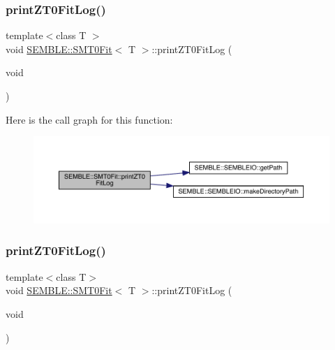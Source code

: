 \subsubsection{\texorpdfstring{printZT0FitLog()}{printZT0FitLog()}\hspace{0.1cm}{\footnotesize\ttfamily [1/2]}}
{\footnotesize\ttfamily template$<$class T $>$ \\
void \mbox{\hyperlink{structSEMBLE_1_1SMT0Fit}{S\+E\+M\+B\+L\+E\+::\+S\+M\+T0\+Fit}}$<$ T $>$\+::print\+Z\+T0\+Fit\+Log (\begin{DoxyParamCaption}\item[{void}]{ }\end{DoxyParamCaption})}

Here is the call graph for this function\+:
\nopagebreak
\begin{figure}[H]
\begin{center}
\leavevmode
\includegraphics[width=350pt]{d6/dad/structSEMBLE_1_1SMT0Fit_af8e7b3bd0f80d0f4eda9c02d0aa89912_cgraph}
\end{center}
\end{figure}
\mbox{\label{structSEMBLE_1_1SMT0Fit_af8e7b3bd0f80d0f4eda9c02d0aa89912}} 
\subsubsection{\texorpdfstring{printZT0FitLog()}{printZT0FitLog()}\hspace{0.1cm}{\footnotesize\ttfamily [2/2]}}
{\footnotesize\ttfamily template$<$class T$>$ \\
void \mbox{\hyperlink{structSEMBLE_1_1SMT0Fit}{S\+E\+M\+B\+L\+E\+::\+S\+M\+T0\+Fit}}$<$ T $>$\+::print\+Z\+T0\+Fit\+Log (\begin{DoxyParamCaption}\item[{void}]{ }\end{DoxyParamCaption})}

